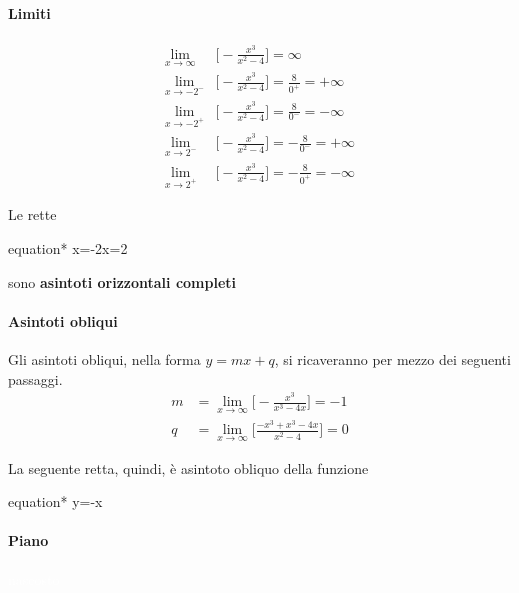 \documentclass[a4paper, oneside]{article}
\newcommand*\mygraybox[0]{%
		\tcbhighmath}
\newcommand{\equazione}[1]{	\begin{empheq}[box=\mygraybox]{equation*}
			#1
		\end{empheq}}
\newcounter{i}%
\newcounter{j}%
\newcounter{n}%
\begin{document}
	\paragraph{Limiti}
	\begin{align*}
		\lim_{x\to \infty} &\Big[-\frac{x^3}{x^2-4}\Big]=\infty\\
		\lim_{x\to -2^-} &\Big[-\frac{x^3}{x^2-4}\Big]=\frac{8}{0^+}=+\infty\\
		\lim_{x\to -2^+} &\Big[-\frac{x^3}{x^2-4}\Big]=\frac{8}{0^-}=-\infty\\
		\lim_{x\to 2^-} &\Big[-\frac{x^3}{x^2-4}\Big]=-\frac{8}{0^-}=+\infty\\
		\lim_{x\to 2^+} &\Big[-\frac{x^3}{x^2-4}\Big]=-\frac{8}{0^+}=-\infty
	\end{align*}
	
	Le rette
	\equazione{x=-2\qquad x=2}
	sono \textbf{asintoti orizzontali completi}
	
	\paragraph{Asintoti obliqui}
	
	Gli asintoti obliqui, nella forma $y=mx+q$, si ricaveranno per mezzo dei seguenti passaggi.	
	\begin{align*}
		m&=\lim_{x\to\infty}\Big[-\frac{x^3}{x^3-4x}\Big]=-1\\
		q&=\lim_{x\to\infty}\Big[\frac{-x^3+x^3-4x}{x^2-4}\Big]=0
	\end{align*}
	
	La seguente retta, quindi, è asintoto obliquo della funzione
	\equazione{y=-x}
	\newpage
	
	\paragraph{Piano}\textcolor{white}{nascosto}
	
	\begin{center}
	\end{center}
\end{document}
